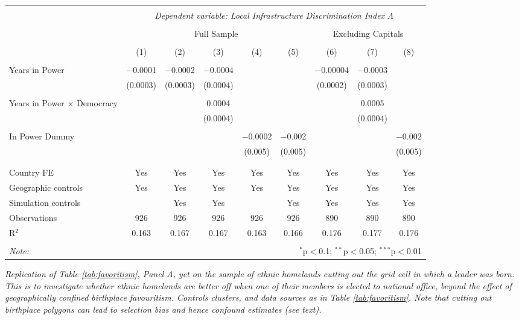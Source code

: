 \documentclass[11pt, oneside]{article}   	%
\newcommand{\mysubcaption}[1]{
\justify
\begin{spacing}{0.7}
\textit{\footnotesize #1}
\end{spacing}}
\begin{document}
\begin{table}[h]
{    \begin{tabular}{@{\extracolsep{5pt}}lcccccccc}
    \\[-1.8ex]\hline
    \hline \\[-1.8ex]
     & \multicolumn{8}{c}{\textit{Dependent variable: Local Infrastructure Discrimination Index $\Lambda$}} \\
    \cline{2-9} \\[-1.8ex]
  & \multicolumn{5}{c}{Full Sample} & \multicolumn{3}{c}{Excluding Capitals} \\
    \cline{2-6}   \cline{7-9}
    \\[-1.8ex] & (1) & (2) & (3) & (4) & (5) & (6) & (7) & (8)\\
    \hline \\[-1.8ex]
    Years in Power & $-$0.0001 & $-$0.0002 & $-$0.0004 &  &  & $-$0.00004 & $-$0.0003 &  \\
     & (0.0003) & (0.0003) & (0.0004) &  &  & (0.0002) & (0.0003) &  \\
     & & & & & & & & \\
    Years in Power $\times$ Democracy &  &  & 0.0004 &  &  &  & 0.0005 &  \\
     &  &  & (0.0004) &  &  &  & (0.0004) &  \\
     & & & & & & & & \\
    In Power Dummy &  &  &  & $-$0.0002 & $-$0.002 &  &  & $-$0.002 \\
     &  &  &  & (0.005) & (0.005) &  &  & (0.005) \\
     & & & & & & & & \\
   \hline \\[-1.8ex]
   Country FE & Yes & Yes & Yes & Yes & Yes & Yes & Yes & Yes \\
   Geographic controls & Yes & Yes & Yes & Yes & Yes & Yes & Yes & Yes \\
   Simulation controls &  & Yes & Yes &  & Yes & Yes & Yes & Yes \\
   Observations & 926 & 926 & 926 & 926 & 926 & 890 & 890 & 890 \\
   R$^{2}$ & 0.163 & 0.167 & 0.167 & 0.163 & 0.166 & 0.176 & 0.177 & 0.176 \\
   \hline
   \hline \\[-1.8ex]
   \textit{Note:}  & \multicolumn{8}{r}{$^{*}$p$<$0.1; $^{**}$p$<$0.05; $^{***}$p$<$0.01} \\
   \end{tabular}

  }

  \mysubcaption{Replication of Table \eqref{tab:favoritism}, Panel A, yet on the sample of ethnic homelands cutting out the grid cell in which a leader was born. This is to investigate whether ethnic homelands are better off when one of their members is elected to national office, beyond the effect of geographically confined birthplace favouritism. Controls clusters, and data sources as in Table \eqref{tab:favoritism}. Note that cutting out birthplace polygons can lead to selection bias and hence confound estimates (see text).}
  \end{table}
\end{document}
